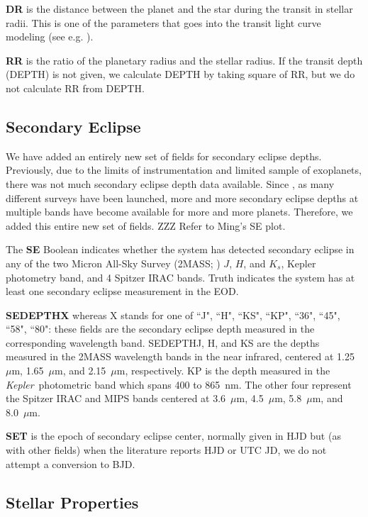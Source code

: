 \documentclass[11pt,preprint]{aastex}
\def\micron{$\mu$m}
\def\kepler{\textit{Kepler}}
\def\micron{$\mu$m}
\begin{document}
\begin{CJK*}{UTF8}{gbsn}
{\bf DR} is the distance between the planet and the star during the
transit in stellar radii. This is one of the parameters that goes into
the transit light curve modeling (see e.g. \citealt{Batalha2013}).

{\bf RR} is the ratio of the planetary radius and the stellar
radius. If the transit depth (DEPTH) is not given, we calculate DEPTH
by taking square of RR, but we do not calculate RR from DEPTH.


\subsection{Secondary Eclipse}\label{sec:se}

We have added an entirely new set of fields for secondary
eclipse depths. Previously, due to the limits of instrumentation and limited
sample of exoplanets, there was not much secondary eclipse depth data
available. Since \cite{Wright2011}, as many different surveys have
been launched, more and more secondary eclipse depths at multiple
bands have become available for more and more planets. Therefore, we added
this entire new set of fields. ZZZ Refer to Ming's SE plot.

The {\bf SE} Boolean indicates whether the system has detected secondary
eclipse in any of the two Micron All-Sky Survey (2MASS;
\citealt{Skrutskie2006}) $J$, $H$, and $K_s$, Kepler photometry band,
and 4 Spitzer IRAC bands. Truth indicates the
system has at least one secondary eclipse measurement in the EOD.

{\bf SEDEPTHX} whereas X stands for one of ``J", ``H", ``KS", ``KP", ``36", ``45", ``58", ``80":
these fields are the secondary eclipse depth measured in the
corresponding wavelength band. SEDEPTHJ, H, and KS are the depths
measured in the 2MASS wavelength bands in the near infrared, centered
at 1.25~\micron, 1.65~\micron, and 2.15~\micron, respectively. KP is
the depth measured in the \kepler\ photometric band which spans 400 to 865~nm. The other four represent the Spitzer IRAC and MIPS bands centered at
3.6~\micron, 4.5~\micron, 5.8~\micron, and 8.0~\micron.

{\bf SET} is the epoch of secondary eclipse center, normally given in HJD but (as with other fields) when the literature reports HJD or UTC JD, we do not attempt a conversion to BJD. 

\subsection{Stellar Properties}\label{sec:stellarprop}


\end{CJK*}
\end{document}
